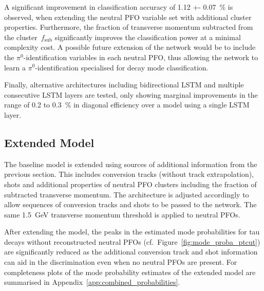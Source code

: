 A significant improvement in classification accuracy of \SI{1.12 +-
  0.07}{\percent} is observed, when extending the neutral PFO variable set with
additional cluster properties. Furthermore, the fraction of transverse momentum
subtracted from the cluster~$f_\text{sub}$ significantly improves the
classification power at a minimal complexity cost. A possible future extension
of the network would be to include the $\pi^0$-identification variables in each
neutral PFO, thus allowing the network to learn a $\pi^0$-identification
specialised for decay mode classification.

Finally, alternative architectures including bidirectional LSTM and multiple
consecutive LSTM layers are tested, only showing marginal improvements in the
range of \num{0.2} to \SI{0.3}{\percent} in diagonal efficiency over a model
using a single LSTM layer.

\subsection{Extended Model}
\label{sec:extended_model}

The baseline model is extended using sources of additional information from the
previous section. This includes conversion tracks (without track extrapolation),
shots and additional properties of neutral PFO clusters including the fraction
of subtracted transverse momentum. The architecture
is adjusted accordingly to allow sequences of conversion tracks and shots to be
passed to the network. The same \SI{1.5}{\GeV} transverse momentum threshold is
applied to neutral PFOs.

After extending the model, the peaks in the estimated mode probabilities for tau
decays without reconstructed neutral PFOs (cf.\
Figure~\ref{fig:mode_proba_ptcut}) are significantly reduced as the additional
conversion track and shot information can aid in the discrimination even when no
neutral PFOs are present. For completeness plots of the mode probability
estimates of the extended model are summarised in
Appendix~\ref{app:combined_probabilities}.


